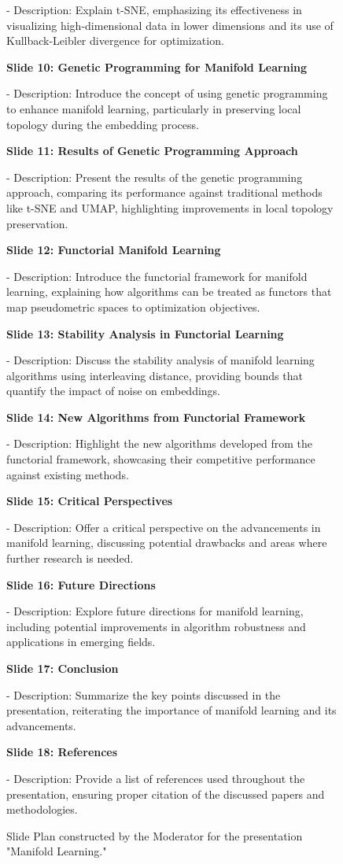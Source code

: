 \documentclass[letterpaper]{article} %
\begin{document}
\begin{figure}
\begin{tcolorbox}[colback=gray!10,colframe=blue!70,title=Slide Plan Case Study ,fonttitle=\bfseries]
- Description: Explain t-SNE, emphasizing its effectiveness in visualizing high-dimensional data in lower dimensions and its use of Kullback-Leibler divergence for optimization.

\textbf{Slide 10: Genetic Programming for Manifold Learning}

- Description: Introduce the concept of using genetic programming to enhance manifold learning, particularly in preserving local topology during the embedding process.

\textbf{Slide 11: Results of Genetic Programming Approach}

- Description: Present the results of the genetic programming approach, comparing its performance against traditional methods like t-SNE and UMAP, highlighting improvements in local topology preservation.    

\textbf{Slide 12: Functorial Manifold Learning}

- Description: Introduce the functorial framework for manifold learning, explaining how algorithms can be treated as functors that map pseudometric spaces to optimization objectives.

\textbf{Slide 13: Stability Analysis in Functorial Learning}

- Description: Discuss the stability analysis of manifold learning algorithms using interleaving distance, providing bounds that quantify the impact of noise on embeddings.

\textbf{Slide 14: New Algorithms from Functorial Framework}

- Description: Highlight the new algorithms developed from the functorial framework, showcasing their competitive performance against existing methods.

\textbf{Slide 15: Critical Perspectives}

- Description: Offer a critical perspective on the advancements in manifold learning, discussing potential drawbacks and areas where further research is needed.

\textbf{Slide 16: Future Directions}

- Description: Explore future directions for manifold learning, including potential improvements in algorithm robustness and applications in emerging fields.

\textbf{Slide 17: Conclusion}

- Description: Summarize the key points discussed in the presentation, reiterating the importance of manifold learning and its advancements.

\textbf{Slide 18: References}

- Description: Provide a list of references used throughout the presentation, ensuring proper citation of the discussed papers and methodologies.

\end{tcolorbox}
\caption{Slide Plan constructed by the Moderator for the presentation "Manifold Learning." }
\label{fig:plan_output}
\end{figure}
\end{document}
